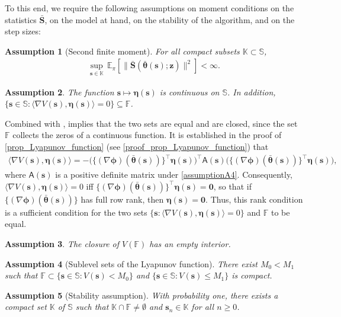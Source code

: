 \documentclass{article}
\newcommand{\zero}{\ensuremath{\mathbf{0}}}
\def\phib        {{\sbmm{\phi}}\XS}        \def\Phib       {{\sbmm{\Phi}}\XS}
\def\XS{\xspace}
\def\sbmm#1{\ensuremath{\boldsymbol{#1}}}
\newtheorem{assumption}{Assumption}
\def\PE{\mathbb{E}_\pi} %
\def\param{\vtheta}
\def\barparam{\bar{\param}}
\def\Kset{\mathbb{K}}
\def\bars{\bar{\vS}}
\def\lyap{V}
\def\rvs{{\mathbf{s}}}
\def\rvz{{\mathbf{z}}}
\def\veta{{\bm{\eta}}}
\def\vtheta{{\bm{\theta}}}
\def\vs{{\bm{s}}}
\def\vS{{\bm{S}}}
\def\sF{{\mathbb{F}}}
\def\sS{{\mathbb{S}}}
\begin{document}
To this end, we require the following assumptions on moment conditions on the statistics $\bars$, on the model at hand, on the stability of the algorithm, and on the step sizes:
\begin{assumption}[Second finite moment]\label{assumptionA7}
For all compact subsets $\Kset \subset \sS$,
    \begin{align*}
        \sup_{\vs \in \Kset}\, \PE\left[ \|\bars\left(\barparam(\vs);\rvz\right)\|^2\right] < \infty.
    \end{align*}
\end{assumption}
\begin{assumption}\label{assumptionA9} The function $\rvs \mapsto \veta(\vs)$ is continuous on $\sS$. In addition, $
        \{\vs \in \sS : \langle \nabla\lyap(\vs), \veta(\vs)\rangle = 0\} \subseteq \sF$.
\end{assumption}
Combined with ,  implies that the two sets are equal and are closed, since the set $\sF$ collects the zeros of a continuous function.  
It is established in the proof of \cref{prop_Lyapunov_function} (see \cref{proof_prop_Lyapunov_function})  that 
\begin{align*}
  \langle \nabla \lyap(\vs), \veta(\vs)\rangle
  = -\Big( \{(\nabla \phib)(\barparam(\vs)) \}^\top \veta(\vs)\Big)^\top
     \mathsf{A}(\vs)
     \Big( \{(\nabla \phib)(\barparam(\vs))\}^\top \veta(\vs)\Big),
\end{align*}
where $\mathsf{A}(\vs)$ is a positive definite matrix under \cref{assumptionA4}. Consequently,
\(\langle \nabla \lyap(\vs), \veta(\vs)\rangle = 0\) iff \(\{(\nabla \phib)(\barparam(\vs))\}^\top \veta(\vs)=\zero\), so that if 
$\{(\nabla \phib)(\barparam(\vs))\}$ has full row rank, then  \(\veta(\vs)=\zero\). Thus, this rank condition is a sufficient condition for the two sets  $\{\vs: \langle \nabla \lyap(\vs), \veta(\vs)\rangle = 0 \}$ and $\sF$  to be equal. 
\begin{assumption}\label{assumptionA8}
The closure of $V(\sF)$ has an empty interior. 
\end{assumption}
\begin{assumption}[Sublevel sets of the Lyapunov function]\label{assumption_compact_sublevel}
There exist $M_0<M_1$ such that $\sF \subset \{\vs \in \sS: \lyap(\vs) < M_0 \}$ and $\{\vs \in \sS: \lyap(\vs) \leq M_1 \}$ is compact. 
\end{assumption}
\begin{assumption}[Stability assumption]\label{assumptionA10}
    With probability one, there exists a compact set $\mathbb K$ of $\sS$ such that $\mathbb{K} \cap \sF \neq \emptyset$ and $\vs_n \in \mathbb K$ for all $n \geq 0$.
\end{assumption}
\end{document}
